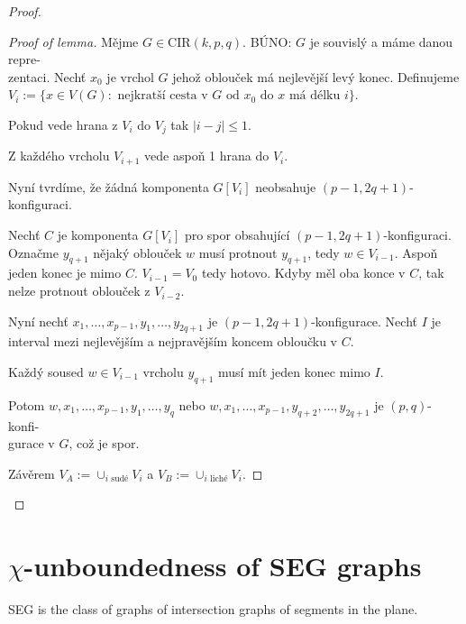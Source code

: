 \begin{proof}
	\begin{proof}[Proof of lemma]
		Mějme $G \in \text{CIR}(k,p,q)$. BÚNO: $G$ je souvislý a máme danou repre-\\zentaci. Nechť $x_0$ je vrchol $G$ jehož oblouček má nejlevější levý konec. Definujeme $V_i := \{x \in V(G) : \text{ nejkratší cesta v } G \text{ od } x_0 \text{ do } x \text{ má délku } i\}$.
		
		\begin{observ}
			Pokud vede hrana z $V_i$ do $V_j$ tak $|i - j| \leq 1$.
		\end{observ}
		
		\begin{observ}
			Z každého vrcholu $V_{i+1}$ vede aspoň 1 hrana do $V_i$.
		\end{observ}
		
		Nyní tvrdíme, že žádná komponenta $G[V_i]$ neobsahuje $(p-1, 2q + 1)$-konfiguraci.
		
		Nechť $C$ je komponenta $G[V_i]$ pro spor obsahující $(p-1, 2q + 1)$-konfiguraci. Označme $y_{q+1}$ nějaký oblouček $w$ musí protnout $y_{q+1}$, tedy $w \in V_{i-1}$. Aspoň jeden konec je mimo $C$. $V_{i-1} = V_0$ tedy hotovo. Kdyby měl oba konce v $C$, tak nelze protnout oblouček z $V_{i-2}$.
		
		Nyní nechť $x_1, \dots, x_{p-1}, y_{1}, \dots, y_{2q+1}$ je $(p-1, 2q + 1)$-konfigurace. Nechť $I$ je interval mezi nejlevějším a nejpravějším koncem obloučku v $C$.
		
		\begin{observ}
			Každý soused $w \in V_{i-1}$ vrcholu $y_{q+1}$ musí mít jeden konec mimo $I$.
		\end{observ}
		
		Potom $w, x_1, \dots, x_{p-1}, y_{1}, \dots, y_q$ nebo $w, x_1, \dots, x_{p-1}, y_{q+2}, \dots, y_{2q+1}$ je $(p,q)$-konfi-\\gurace v $G$, což je spor.
		
		Závěrem $V_{A} := \cup_{i \text{ sudé}} V_{i}$ a $V_{B} := \cup_{i \text{ liché}} V_{i}$.
	\end{proof}
\end{proof}

\section{$\chi$-unboundedness of SEG graphs}

\begin{defn}
	SEG is the class of graphs of intersection graphs of segments in the plane.
\end{defn}

